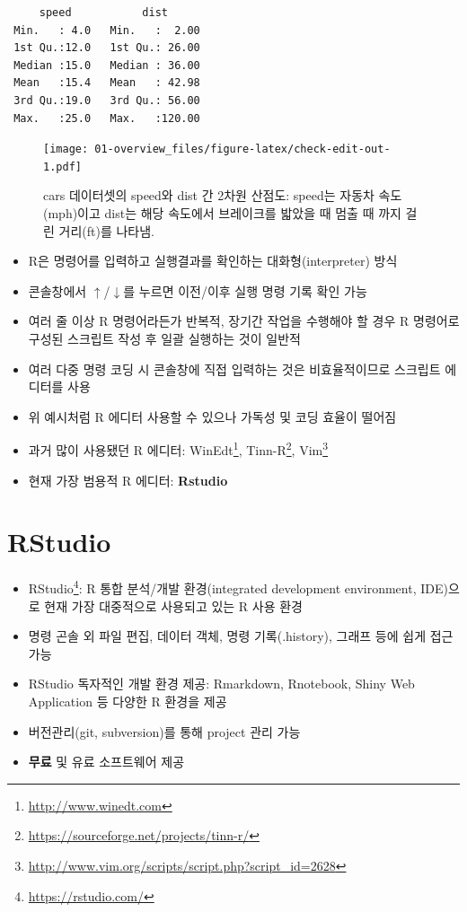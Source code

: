 \documentclass[
  11pt,
]{krantz}
\providecommand{\tightlist}{%
  \setlength{\itemsep}{0pt}\setlength{\parskip}{0pt}}
\renewcommand{\href}[2]{#2\footnote{\url{#1}}}
\begin{document}
\begin{verbatim}
     speed           dist       
 Min.   : 4.0   Min.   :  2.00  
 1st Qu.:12.0   1st Qu.: 26.00  
 Median :15.0   Median : 36.00  
 Mean   :15.4   Mean   : 42.98  
 3rd Qu.:19.0   3rd Qu.: 56.00  
 Max.   :25.0   Max.   :120.00  
\end{verbatim}

\begin{figure}
\centering
\texttt{[image: 01-overview\_files/figure-latex/check-edit-out-1.pdf]}
\caption{\label{fig:check-edit-out}cars 데이터셋의 speed와 dist 간 2차원 산점도: speed는 자동차 속도(mph)이고 dist는 해당 속도에서 브레이크를 밟았을 때 멈출 때 까지 걸린 거리(ft)를 나타냄.}
\end{figure}

\normalsize

\begin{itemize}
\tightlist
\item
  R은 명령어를 입력하고 실행결과를 확인하는 대화형(interpreter) 방식
\item
  콘솔창에서 \(\uparrow\)/\(\downarrow\)를 누르면 이전/이후 실행 명령 기록 확인 가능
\item
  여러 줄 이상 R 명령어라든가 반복적, 장기간 작업을 수행해야 할 경우 R 명령어로 구성된 스크립트 작성 후 일괄 실행하는 것이 일반적
\item
  여러 다중 명령 코딩 시 콘솔창에 직접 입력하는 것은 비효율적이므로 스크립트 에디터를 사용
\item
  위 예시처럼 R 에디터 사용할 수 있으나 가독성 및 코딩 효율이 떨어짐
\item
  과거 많이 사용됐던 R 에디터: \href{http://www.winedt.com}{WinEdt}, \href{https://sourceforge.net/projects/tinn-r/}{Tinn-R}, \href{http://www.vim.org/scripts/script.php?script_id=2628}{Vim}
\item
  현재 가장 범용적 R 에디터: \textbf{Rstudio}
\end{itemize}

\hypertarget{r-studio}{%
\section{RStudio}\label{r-studio}}

\begin{itemize}
\tightlist
\item
  \href{https://rstudio.com/}{RStudio}: R 통합 분석/개발 환경(integrated development environment, IDE)으로 현재 가장 대중적으로 사용되고 있는 R 사용 환경
\item
  명령 곤솔 외 파일 편집, 데이터 객체, 명령 기록(.history), 그래프 등에 쉽게 접근 가능
\item
  RStudio 독자적인 개발 환경 제공: Rmarkdown, Rnotebook, Shiny Web Application 등 다양한 R 환경을 제공
\item
  버전관리(git, subversion)를 통해 project 관리 가능
\item
  \textbf{무료} 및 유료 소프트웨어 제공
\end{itemize}
\end{document}
